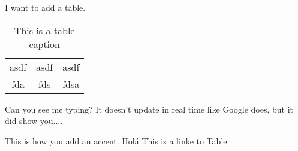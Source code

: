 
I want to add a table.
\begin{table} 
    \begin{tabular}{ c c c }
        asdf & asdf & asdf \\ 
        fda & fds & fdsa \\ 
    \end{tabular} 
    \caption{This is a table caption} 
\end{table}

Can you see me typing? It doesn't update in real time like Google does, but it did show you....

This is how you add an accent. Holá
This is a linke to Table 
